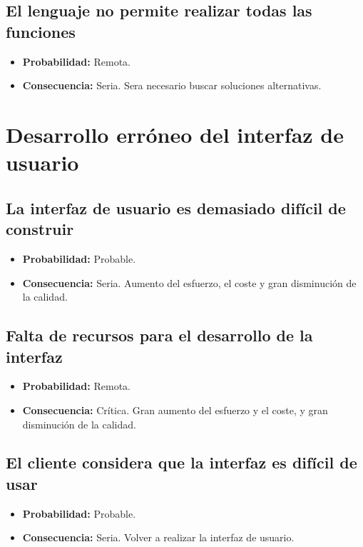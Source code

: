 \documentclass[spanish,a4paper,12pt]{report}	%
\begin{document}
\subsection*{El lenguaje no permite realizar todas las funciones}
	\begin{itemize}
		\item \textbf {Probabilidad: }Remota.
		\item \textbf {Consecuencia: }Seria. Sera necesario buscar soluciones alternativas.
	\end{itemize}


%
\section{Desarrollo erróneo del interfaz de usuario}

\subsection*{La interfaz de usuario es demasiado difícil de construir}
	\begin{itemize}
		\item \textbf {Probabilidad: }Probable.
		\item \textbf {Consecuencia: }Seria. Aumento del esfuerzo, el coste y gran disminución de la calidad.
	\end{itemize}

\subsection*{Falta de recursos para el desarrollo de la interfaz}
	\begin{itemize}
		\item \textbf {Probabilidad: }Remota.
		\item \textbf {Consecuencia: }Crítica. Gran aumento del esfuerzo y el coste, y gran disminución de la calidad.
	\end{itemize}

\subsection*{El cliente considera que la interfaz es difícil de usar}
	\begin{itemize}
		\item \textbf {Probabilidad: }Probable.
		\item \textbf {Consecuencia: }Seria. Volver a realizar la interfaz de usuario.
	\end{itemize}
\end{document}
